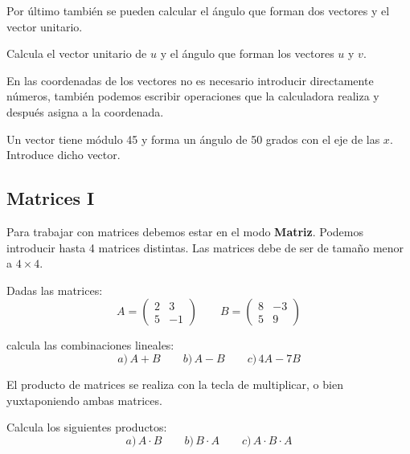 \documentclass[12pt]{article}
\newenvironment{capitulo}{\begin{tcolorbox}[colback=blue!5!white,colframe=red!75!black]}{\end{tcolorbox}\bigskip}
\newenvironment{ejer}{\begin{tcolorbox}[center title, 
fonttitle=\sffamily\bfseries,colback=blue!5,colframe=orange]}{\end{tcolorbox}}
\begin{document}
Por último también se pueden calcular el ángulo que forman dos vectores y el vector unitario.

\begin{ejer} 

Calcula el vector unitario de $u$ y el ángulo que forman los vectores $u$ y $v$.

\end{ejer}

En las coordenadas de los vectores no es necesario introducir directamente números, también podemos escribir operaciones que la calculadora realiza y después asigna a la coordenada.

\begin{ejer}

Un vector tiene módulo 45 y forma un ángulo de 50 grados con el eje de las $x$. Introduce dicho vector.

\end{ejer}


\newpage

\begin{capitulo}
\section*{Matrices I}
\end{capitulo}

Para trabajar con matrices debemos estar en el modo \textbf{Matriz}. Podemos introducir hasta 4 matrices distintas. Las matrices debe de ser de tamaño menor a $4\times 4$.

\begin{ejer}

Dadas las matrices:
\[
A=\begin{pmatrix}
2 & 3\\
5 & -1
\end{pmatrix} \qquad 
B =
\begin{pmatrix}
8 & -3\\
5 & 9
\end{pmatrix}
\]

calcula las combinaciones lineales:
\[
a)\, A+B\qquad  b)\, A-B\qquad c)\, 4A-7 B
\]

\end{ejer}

El producto de matrices se realiza con la tecla de multiplicar, o bien yuxtaponiendo ambas matrices.

\begin{ejer}

Calcula los siguientes productos:
\[
a)\,  A\cdot B \qquad   b)\, B \cdot A  \qquad c)\, A \cdot B \cdot A
\]

\end{ejer}
\end{document}
